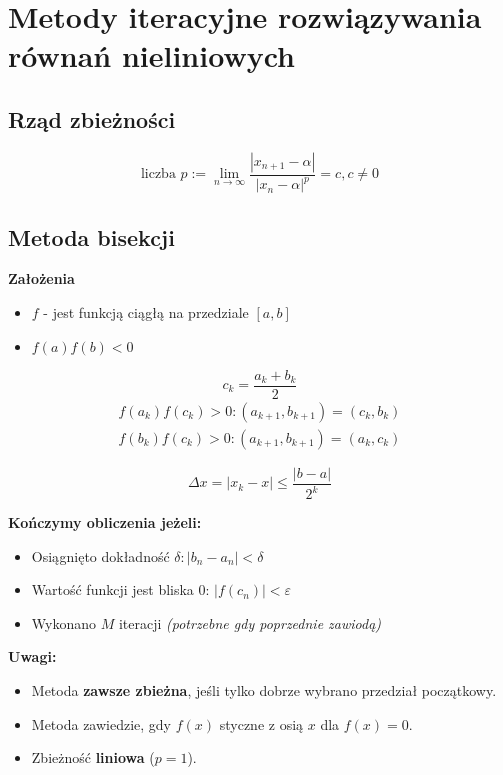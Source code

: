 \documentclass[../mn-notatki.tex]{subfiles}
\begin{document}
\section{Metody iteracyjne rozwiązywania równań nieliniowych}

\subsection{Rząd zbieżności}
\begin{tcolorbox}
\[
\text{liczba } p := \lim_{n \to \infty} \frac{|x_{n+1} - \alpha|}{|x_n - \alpha|^p} = c, c \neq 0
\]
\end{tcolorbox}

\subsection{Metoda bisekcji}

\textbf{Założenia}
\begin{itemize}
    \item $f$ - jest funkcją ciągłą na przedziale $[a,b]$
    \item $f(a)f(b) < 0$
\end{itemize}

\begin{tcolorbox}
\[
c_k = \frac{a_k + b_k}{2}
\]
\begin{gather*}
f(a_k)f(c_k) > 0 : (a_{k+1}, b_{k+1}) = (c_k, b_k)\\
f(b_k)f(c_k) > 0 : (a_{k+1}, b_{k+1}) = (a_k, c_k)
\end{gather*}
\end{tcolorbox}
\begin{tcolorbox}
\[
\Delta x = |x_k - x| \leqslant \frac{|b - a|}{2^k}
\]
\end{tcolorbox}
\textbf{Kończymy obliczenia jeżeli:}
\begin{itemize}
    \item Osiągnięto dokładność $\delta: |b_n - a_n| < \delta$
    \item Wartość funkcji jest bliska $0$: $|f(c_n)| < \varepsilon$
    \item Wykonano $M$ iteracji \textit{(potrzebne gdy poprzednie zawiodą)}
\end{itemize}

\textbf{Uwagi:}
\begin{itemize}
    \item Metoda \textbf{zawsze zbieżna}, jeśli tylko dobrze wybrano przedział
    początkowy.
    \item Metoda zawiedzie, gdy $f(x)$ styczne z osią $x$ dla $f(x) = 0$.
    \item Zbieżność \textbf{liniowa} ($p = 1$).
\end{itemize}
\end{document}
